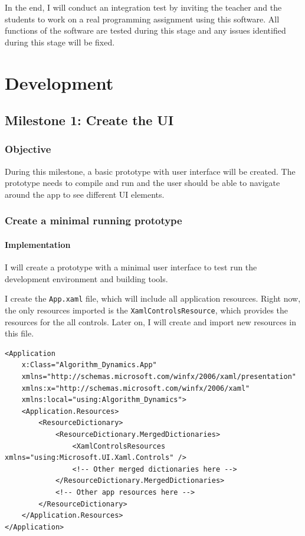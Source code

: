 \documentclass[a4paper]{report}
\begin{document}
In the end, I will conduct an integration test by inviting the teacher and the students to work on a real programming assignment using this software. All functions of the software are tested during this stage and any issues identified during this stage will be fixed.

\chapter{Development}

\section{Milestone 1: Create the UI}

\subsection{Objective}

During this milestone, a basic prototype with user interface will be created. The prototype needs to compile and run and the user should be able to navigate around the app to see different UI elements.

\subsection{Create a minimal running prototype}

\subsubsection{Implementation}

I will create a prototype with a minimal user interface to test run the development environment and building tools.\cite{microsoft:docs:create-your-first-winui3-app}

I create the \verb|App.xaml| file, which will include all application resources. Right now, the only resources imported is the \verb|XamlControlsResource|, which provides the resources for the all controls. Later on, I will create and import new resources in this file.

\begin{verbatim}
<Application
    x:Class="Algorithm_Dynamics.App"
    xmlns="http://schemas.microsoft.com/winfx/2006/xaml/presentation"
    xmlns:x="http://schemas.microsoft.com/winfx/2006/xaml"
    xmlns:local="using:Algorithm_Dynamics">
    <Application.Resources>
        <ResourceDictionary>
            <ResourceDictionary.MergedDictionaries>
                <XamlControlsResources xmlns="using:Microsoft.UI.Xaml.Controls" />
                <!-- Other merged dictionaries here -->
            </ResourceDictionary.MergedDictionaries>
            <!-- Other app resources here -->
        </ResourceDictionary>
    </Application.Resources>
</Application>
\end{verbatim}
\end{document}
